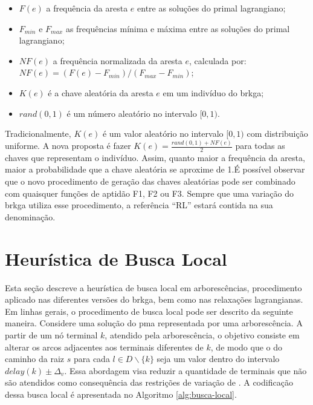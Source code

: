 \begin{itemize}
  \item  $F(e)$  a  frequência  da  aresta  $e$  entre  as  soluções  do  primal
lagrangiano;
  \item $F_{min}$ e  $F_{max}$ as frequências mínima e máxima  entre as soluções
do primal lagrangiano;
  \item $NF(e)$ a frequência normalizada da  aresta $e$, calculada por: $NF(e) =
(F(e) - F_{min}) / (F_{max} - F_{min})$;
  \item $K(e)$ é a chave aleatória da aresta $e$ em um indivíduo do \gls{brkga};
  \item $rand(0, 1)$ é um número aleatório no intervalo $[0, 1)$.
\end{itemize}

Tradicionalmente,  $K(e)$  é  um  valor  aleatório no  intervalo  $[0,  1)$  com
distribuição  uniforme. A  nova  proposta é  fazer $K(e)  =  \frac{rand(0, 1)  +
NF(e)}{2}$ para todas as chaves que representam o indivíduo. Assim, quanto maior
a frequência da aresta, maior a  probabilidade que a chave aleatória se aproxime
de  1.É  possível  observar  que  o novo  procedimento  de  geração  das  chaves
aleatórias pode  ser combinado com  quaisquer funções de  aptidão F1, F2  ou F3.
Sempre que uma  variação do \gls{brkga} utiliza esse  procedimento, a referência
``RL'' estará contida na sua denominação.

\section{Heurística de Busca Local} \label{sec:heuristica-bl}

Esta seção descreve a heurística  de busca local em arborescências, procedimento
aplicado  nas  diferentes  versões  do  \gls{brkga},  bem  como  nas  relaxações
lagrangianas. Em linhas gerais, o procedimento  de busca local pode ser descrito
da seguinte  maneira. Considere  uma solução do  \gls{pma} representada  por uma
arborescência. A  partir de um nó  terminal $k$, atendido pela  arborescência, o
objetivo consiste  em alterar  os arcos adjacentes  aos terminais  diferentes de
$k$,  de  modo  que  o  {\delay}  do  caminho da  raiz  $s$  para  cada  $l  \in
D\backslash\{k\}$ seja  um valor  dentro do  intervalo $delay(k)  \pm \Delta_v$.
Essa abordagem visa reduzir a quantidade de terminais que não são atendidos como
consequência das restrições  de variação de {\delay}. A  codificação dessa busca
local é apresentada no Algoritmo \ref{alg:busca-local}.

